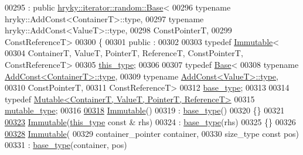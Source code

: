 \begin{DoxyCode}
00295     : \textcolor{keyword}{public} \hyperlink{classhryky_1_1iterator_1_1random_1_1_base}{hryky::iterator::random::Base}<
00296         typename hryky::AddConst<ContainerT>::type,
00297         typename hryky::AddConst<ValueT>::type,
00298         ConstPointerT,
00299         ConstReferenceT>
00300 \{
00301 \textcolor{keyword}{public} :
00302 
00303     \textcolor{keyword}{typedef} \hyperlink{classhryky_1_1iterator_1_1random_1_1_immutable}{Immutable}<
00304         ContainerT, ValueT, PointerT, ReferenceT, ConstPointerT, 
      ConstReferenceT>
00305             \hyperlink{classhryky_1_1iterator_1_1random_1_1_immutable}{this_type};
00306     
00307     \textcolor{keyword}{typedef} \hyperlink{classhryky_1_1iterator_1_1random_1_1_base}{Base}<
00308         \textcolor{keyword}{typename} \hyperlink{classhryky_1_1_add_const}{AddConst<ContainerT>::type},
00309         \textcolor{keyword}{typename} \hyperlink{classhryky_1_1_add_const_adb29046fcfdac9d716cb5cb3c28d42ac}{AddConst<ValueT>::type},
00310         ConstPointerT,
00311         ConstReferenceT>
00312             \hyperlink{classhryky_1_1iterator_1_1random_1_1_base}{base_type};
00313 
00314     \textcolor{keyword}{typedef} \hyperlink{classhryky_1_1iterator_1_1random_1_1_mutable}{Mutable<ContainerT, ValueT, PointerT, ReferenceT>}
00315         \hyperlink{classhryky_1_1iterator_1_1random_1_1_mutable}{mutable_type};
00316     
\hypertarget{iterator__random_8h_source_l00318}{}\hyperlink{classhryky_1_1iterator_1_1random_1_1_immutable_a2beb96e03bda518e125d7dba45cf0aaa}{00318}     \hyperlink{classhryky_1_1iterator_1_1random_1_1_immutable_a2beb96e03bda518e125d7dba45cf0aaa}{Immutable}()
00319         : \hyperlink{classhryky_1_1iterator_1_1random_1_1_base}{base_type}()
00320     \{\}
00321 
\hypertarget{iterator__random_8h_source_l00323}{}\hyperlink{classhryky_1_1iterator_1_1random_1_1_immutable_a7b0ce10cf94aeca0c9f47de9ddfc6a46}{00323}     \hyperlink{classhryky_1_1iterator_1_1random_1_1_immutable_a2beb96e03bda518e125d7dba45cf0aaa}{Immutable}(\hyperlink{classhryky_1_1iterator_1_1random_1_1_immutable}{this_type} \textcolor{keyword}{const} & rhs)
00324         : \hyperlink{classhryky_1_1iterator_1_1random_1_1_base}{base_type}(rhs)
00325     \{\}
00326 
\hypertarget{iterator__random_8h_source_l00328}{}\hyperlink{classhryky_1_1iterator_1_1random_1_1_immutable_a6143628ffb64b7782b4f4138ec846b74}{00328}     \hyperlink{classhryky_1_1iterator_1_1random_1_1_immutable_a2beb96e03bda518e125d7dba45cf0aaa}{Immutable}(
00329         container\_pointer container,
00330         size\_type \textcolor{keyword}{const} pos)
00331         : \hyperlink{classhryky_1_1iterator_1_1random_1_1_base}{base_type}(container, pos)

\end{DoxyCode}
